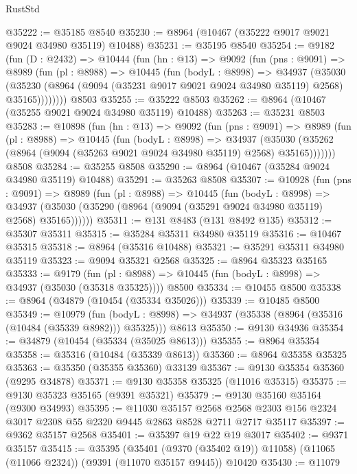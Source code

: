 \begin{lexlean}{RustStd}
\begin{coremodule}
@35222 := @35185 @8540
@35230 := @8964 (@10467 (@35222 @9017 @9021 @9024 @34980 @35119) @10488)
@35231 := @35195 @8540
@35254 := @9182
    (fun (D : @2432) =>
    @10444
      (fun (hn : @13) =>
      @9092
        (fun (pns : @9091) =>
        @8989
          (fun (pl : @8988) =>
          @10445
            (fun (bodyL : @8998) =>
            @34937
              (@35030
                (@35230 (@8964 (@9094 (@35231 @9017 @9021 @9024 @34980 @35119) @2568) @35165))))))))
    @8503
@35255 := @35222 @8503
@35262 := @8964 (@10467 (@35255 @9021 @9024 @34980 @35119) @10488)
@35263 := @35231 @8503
@35283 := @10898
    (fun (hn : @13) =>
    @9092
      (fun (pns : @9091) =>
      @8989
        (fun (pl : @8988) =>
        @10445
          (fun (bodyL : @8998) =>
          @34937
            (@35030 (@35262 (@8964 (@9094 (@35263 @9021 @9024 @34980 @35119) @2568) @35165)))))))
    @8508
@35284 := @35255 @8508
@35290 := @8964 (@10467 (@35284 @9024 @34980 @35119) @10488)
@35291 := @35263 @8508
@35307 := @10928
    (fun (pns : @9091) =>
    @8989
      (fun (pl : @8988) =>
      @10445
        (fun (bodyL : @8998) =>
        @34937 (@35030 (@35290 (@8964 (@9094 (@35291 @9024 @34980 @35119) @2568) @35165))))))
@35311 := @131 @8483 (@131 @8492 @135)
@35312 := @35307 @35311
@35315 := @35284 @35311 @34980 @35119
@35316 := @10467 @35315
@35318 := @8964 (@35316 @10488)
@35321 := @35291 @35311 @34980 @35119
@35323 := @9094 @35321 @2568
@35325 := @8964 @35323 @35165
@35333 := @9179
    (fun (pl : @8988) => @10445 (fun (bodyL : @8998) => @34937 (@35030 (@35318 @35325))))
    @8500
@35334 := @10455 @8500
@35338 := @8964 (@34879 (@10454 (@35334 @35026)))
@35339 := @10485 @8500
@35349 := @10979
    (fun (bodyL : @8998) => @34937 (@35338 (@8964 (@35316 (@10484 (@35339 @8982))) @35325)))
    @8613
@35350 := @9130 @34936
@35354 := @34879 (@10454 (@35334 (@35025 @8613)))
@35355 := @8964 @35354
@35358 := @35316 (@10484 (@35339 @8613))
@35360 := @8964 @35358 @35325
@35363 := @35350 (@35355 @35360) @33139
@35367 := @9130 @35354 @35360 (@9295 @34878)
@35371 := @9130 @35358 @35325 (@11016 @35315)
@35375 := @9130 @35323 @35165 (@9391 @35321)
@35379 := @9130 @35160 @35164 (@9300 @34993)
@35395 := @11030
    @35157
    @2568
    @2568
    @2303
    @156
    @2324
    @3017
    @2308
    @55
    @2320
    @9445
    @2863
    @8528
    @2711
    @2717
    @35117
@35397 := @9362 @35157 @2568
@35401 := @35397 @19 @22 @19 @3017
@35402 := @9371 @35157
@35415 := @35395
    (@35401 (@9370 (@35402 @19)) @11058)
    (@11065 (@11066 @2324))
    (@9391 (@11070 @35157 @9445))
    @10420
@35430 := @11079

\end{coremodule}
\end{lexlean}
